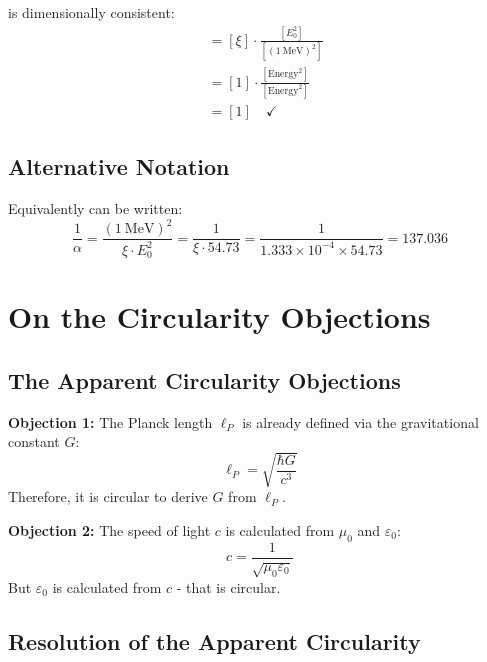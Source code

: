 	is dimensionally consistent:
	\begin{align}
		[\alpha] &= [\xi] \cdot \frac{[E_0^2]}{[( \SI{1}{\MeV} )^2]} \\
		&= [1] \cdot \frac{[\text{Energy}^2]}{[\text{Energy}^2]} \\
		&= [1] \quad \checkmark
	\end{align}
	
	\subsection{Alternative Notation}
	
	Equivalently can be written:
	\begin{equation}
		\frac{1}{\alpha} = \frac{( \SI{1}{\MeV} )^2}{\xi \cdot E_0^2} = \frac{1}{\xi \cdot 54.73} = \frac{1}{1.333 \times 10^{-4} \times 54.73} = 137.036
	\end{equation}
	
	\section{On the Circularity Objections}
	
	\subsection{The Apparent Circularity Objections}
	
	\begin{tcolorbox}[colback=red!10!white,colframe=red!75!black,title=Common Criticisms]
		\textbf{Objection 1:} The Planck length $\ell_P$ is already defined via the gravitational constant $G$:
		\begin{equation}
			\ell_P = \sqrt{\frac{\hbar G}{c^3}}
		\end{equation}
		Therefore, it is circular to derive $G$ from $\ell_P$.
		
		\textbf{Objection 2:} The speed of light $c$ is calculated from $\mu_0$ and $\varepsilon_0$:
		\begin{equation}
			c = \frac{1}{\sqrt{\mu_0 \varepsilon_0}}
		\end{equation}
		But $\varepsilon_0$ is calculated from $c$ - that is circular.
	\end{tcolorbox}
	
	\subsection{Resolution of the Apparent Circularity}
	
